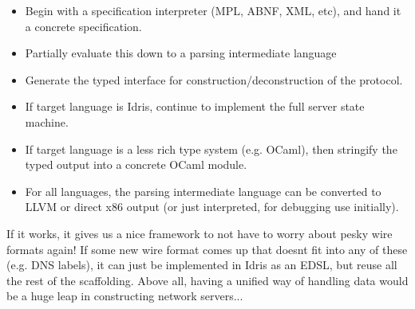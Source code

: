 \documentclass{article}
\begin{document}
\begin{itemize}
\item Begin with a specification interpreter (MPL, ABNF, XML, etc), and hand it a concrete specification.
\item Partially evaluate this down to a parsing intermediate language
\item Generate the typed interface for construction/deconstruction of the protocol.
\item If target language is Idris, continue to implement the full server state machine.
\item If target language is a less rich type system (e.g. OCaml), then stringify the typed output into a concrete OCaml module.
\item For all languages, the parsing intermediate language can be converted to LLVM or direct x86 output (or just interpreted, for debugging use initially).
\end{itemize}

If it works, it gives us a nice framework to not have to worry about pesky wire formats again! If some new wire format comes up that doesnt fit into any of these (e.g. DNS labels), it can just be implemented in Idris as an EDSL, but reuse all the rest of the scaffolding.
Above all, having a unified way of handling data would be a huge leap in constructing network servers... 
\end{document}
